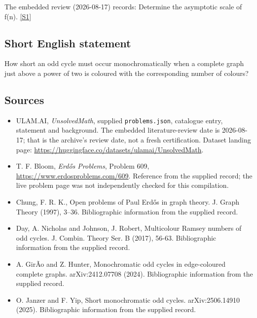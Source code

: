 \documentclass[11pt,a4paper]{article}
\newcommand{\sref}[2]{\hyperlink{source:#1:#2}{[S#2]}}
\begin{document}
The embedded review (2026-08-17) records: Determine the asymptotic scale of f(n). \sref{statement}{1}

\subsection{Short English statement}

How short an odd cycle must occur monochromatically when a complete graph just above a power of two is coloured with the corresponding number of colours?

\subsection{Sources}

{\small

\begin{itemize}

\item[\hypertarget{source:statement:1}{S1}] ULAM.AI, \emph{UnsolvedMath}, supplied \texttt{problems.json}, catalogue entry, statement and background. The embedded literature-review date is 2026-08-17; that is the archive’s review date, not a fresh certification. Dataset landing page: \url{https://huggingface.co/datasets/ulamai/UnsolvedMath}.

\item[\hypertarget{source:statement:2}{S2}] T. F. Bloom, \emph{Erdős Problems}, Problem 609, \url{https://www.erdosproblems.com/609}. Reference from the supplied record; the live problem page was not independently checked for this compilation.

\item[\hypertarget{source:statement:3}{S3}] Chung, F. R. K., Open problems of {P}aul Erd\H{o}s in graph theory. J. Graph Theory (1997), 3--36. Bibliographic information from the supplied record.

\item[\hypertarget{source:statement:4}{S4}] Day, A. Nicholas and Johnson, J. Robert, Multicolour Ramsey numbers of odd cycles. J. Combin. Theory Ser. B (2017), 56-63. Bibliographic information from the supplied record.

\item[\hypertarget{source:statement:5}{S5}] A. Gir\~Ao and Z. Hunter, Monochromatic odd cycles in edge-coloured complete graphs. arXiv:2412.07708 (2024). Bibliographic information from the supplied record.

\item[\hypertarget{source:statement:6}{S6}] O. Janzer and F. Yip, Short monochromatic odd cycles. arXiv:2506.14910 (2025). Bibliographic information from the supplied record.

\end{itemize}

}

\label{end:statement}
\end{document}
